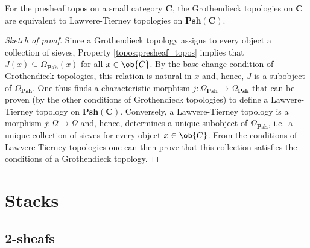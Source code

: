     \begin{property}
        For the presheaf topos on a small category $\mathbf{C}$, the Grothendieck topologies on $\mathbf{C}$ are equivalent to Lawvere-Tierney topologies on $\mathbf{Psh(C)}$.
        \begin{proof}[Sketch of proof]
            Since a Grothendieck topology assigns to every object a collection of sieves, Property \ref{topos:presheaf_topos} implies that $J(x)\subseteq\Omega_\mathbf{Psh}(x)$ for all $x\in\ob{C}$. By the base change condition of Grothendieck topologies, this relation is natural in $x$ and, hence, $J$ is a subobject of $\Omega_\mathbf{Psh}$. One thus finds a characteristic morphism $j:\Omega_\mathbf{Psh}\rightarrow\Omega_\mathbf{Psh}$ that can be proven (by the other conditions of Grothendieck topologies) to define a Lawvere-Tierney topology on $\mathbf{Psh(C)}$. Conversely, a Lawvere-Tierney topology is a morphism $j:\Omega\rightarrow\Omega$ and, hence, determines a unique subobject of $\Omega_\mathbf{Psh}$, i.e.~a unique collection of sieves for every object $x\in\ob{C}$. From the conditions of Lawvere-Tierney topologies one can then prove that this collection satisfies the conditions of a Grothendieck topology.
        \end{proof}
    \end{property}

\section{Stacks}
\subsection{2-sheafs}

